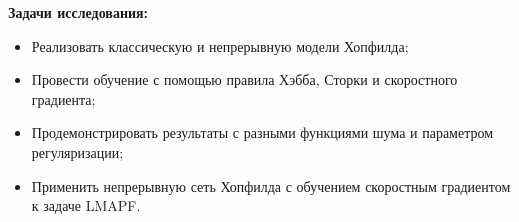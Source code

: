 \textbf{Задачи исследования:}
\begin{itemize}
  \item
        Реализовать классическую и непрерывную модели Хопфилда;
  \item
        Провести обучение с помощью правила Хэбба, Сторки и скоростного
        градиента;
  \item
        Продемонстрировать результаты с разными функциями шума и
        параметром регуляризации;
  \item
        Применить непрерывную сеть Хопфилда с обучением скоростным градиентом
        к задаче LMAPF.
\end{itemize}